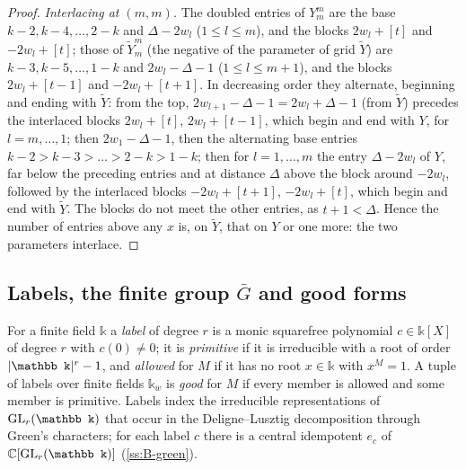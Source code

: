 \begin{proof}
\emph{Interlacing at $(m,m)$.} The doubled entries of $Y^m_m$ are the base $k-2,k-4,\dots,2-k$ and $\Delta-2w_l$ ($1\le l\le m$), and the blocks $2w_l+[t]$ and $-2w_l+[t]$; those of $\tilde Y^m_m$ (the negative of the parameter of grid $\tilde Y$) are $k-3,k-5,\dots,1-k$ and $2w_l-\Delta-1$ ($1\le l\le m+1$), and the blocks
$2w_l+[t-1]$ and $-2w_l+[t+1]$. In decreasing order they alternate, beginning and ending with $\tilde Y$: from the top, $2w_{l+1}-\Delta-1=2w_l+\Delta-1$ (from $\tilde Y$) precedes the interlaced blocks $2w_l+[t]$, $2w_l+[t-1]$, which begin and end with $Y$, for $l=m,\dots,1$; then $2w_1-\Delta-1$, then the alternating base entries
$k-2>k-3>\dots>2-k>1-k$; then for $l=1,\dots,m$ the entry $\Delta-2w_l$ of $Y$, far below the preceding entries and at distance $\Delta$ above the block around $-2w_l$, followed by the interlaced blocks $-2w_l+[t+1]$, $-2w_l+[t]$, which begin and end with $\tilde Y$. The blocks do not meet the other entries, as $t+1<\Delta$. Hence the number of
entries above any $x$ is, on $\tilde Y$, that on $Y$ or one more: the two parameters interlace.
\end{proof}

\subsection{Labels, the finite group \texorpdfstring{$\bar G$}{G} and good forms}\label{ss:target}
For a finite field $\mathbb k$ a \emph{label} of degree $r$ is a monic squarefree polynomial $c\in\mathbb
k[X]$ of degree $r$ with $c(0)\ne0$; it is \emph{primitive} if it is irreducible with a root of order
$\abs{\mathbb k}^r-1$, and \emph{allowed} for $M$ if it has no root $x\in\mathbb k$ with $x^M=1$. A tuple of
labels over finite fields $\mathbb k_w$ is \emph{good} for $M$ if every member is allowed and some member
is primitive. Labels index the irreducible representations of $\GL_r(\mathbb k)$ that occur in the
Deligne--Lusztig decomposition through Green's characters; for each label $c$ there is a central
idempotent $e_c$ of $\C[\GL_r(\mathbb k)]$ (\cref{ss:B-green}).

